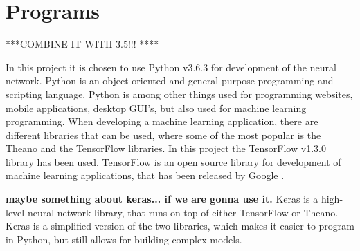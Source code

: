 \section{Programs} ***COMBINE IT WITH 3.5!!! ****

In this project it is chosen to use Python v3.6.3 for development of the neural network.  
Python is an object-oriented and general-purpose programming and scripting language. Python is among other things used for programming websites, mobile applications, desktop GUI's, but also used for machine learning programming.
When developing a machine learning application, there are different libraries that can be used, where some of the most popular is the Theano and the TensorFlow libraries.\citep{Swamynathan2017}
\noindent
In this project the TensorFlow v1.3.0 library has been used. 
TensorFlow is an open source library for development of machine learning applications, that has been released by Google \citep{Swamynathan2017}. 


\textbf{maybe something about keras... if we are gonna use it.  }
\noindent
Keras is a high-level neural network library, that runs on top of either TensorFlow or Theano. Keras is a simplified version of the two libraries, which makes it easier to program in Python, but still allows for building complex models.\citep{Swamynathan2017}  